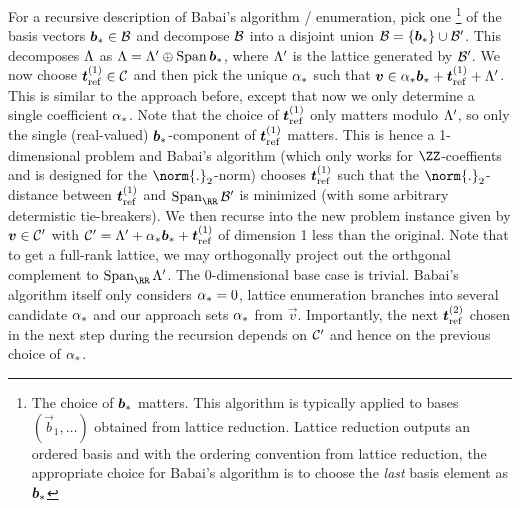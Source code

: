 \begin{remark}
For a recursive description of Babai's algorithm / enumeration, pick one%
\footnote{The choice of $\boldsymbol{b}_{\ast}$ matters. This algorithm is typically applied to bases $(\vec{b}_1,\ldots)$ obtained from lattice reduction. Lattice reduction outputs an ordered basis and with the ordering convention from lattice reduction, the appropriate choice for Babai's algorithm is to choose the \emph{last} basis element as $\boldsymbol{b}_{\ast}$}
of the basis vectors $\boldsymbol{b}_{\ast}\in\mathcal{B}$ and decompose $\mathcal{B}$ into a disjoint union
$\mathcal{B} = \{\boldsymbol{b}_{\ast}\}\cup \mathcal{B}'$. This decomposes $\Lambda$ as $\Lambda = \Lambda'\oplus \operatorname*{Span}\boldsymbol{b}_{\ast}$, where $\Lambda'$ is the lattice generated by $\mathcal{B}'$. We now choose $\boldsymbol{t}_{\mathrm{ref}}^{(1)}\in\mathcal{C}$ and then pick the unique $\alpha_{\ast}$ such that $\boldsymbol{v} \in \alpha_{\ast}\boldsymbol{b}_{\ast} + \boldsymbol{t}_{\mathrm{ref}}^{(1)} + \Lambda'$. This is similar to the approach before, except that now we only determine a single coefficient $\alpha_{\ast}$. Note that the choice of $\boldsymbol{t}_{\mathrm{ref}}^{(1)}$ only matters modulo $\Lambda'$, so only the single (real-valued) $\boldsymbol{b}_{\ast}$-component of $\boldsymbol{t}_{\mathrm{ref}}^{(1)}$ matters. This is hence a 1-dimensional problem and Babai's algorithm (which only works for $\ZZ$-coeffients and is designed for the $\norm{.}_2$-norm) chooses $\boldsymbol{t}_{\mathrm{ref}}^{(1)}$ such that the $\norm{.}_2$-distance between $\boldsymbol{t}_{\mathrm{ref}}^{(1)}$ and $\Span_{\RR}\kernelbasis'$ is minimized (with some arbitrary determistic tie-breakers).
We then recurse into the new problem instance given by $\boldsymbol{v} \in \mathcal{C}'$ with $\mathcal{C}' = \Lambda' + \alpha_{\ast}\boldsymbol{b}_{\ast} + \boldsymbol{t}_{\mathrm{ref}}^{(1)}$ of dimension 1 less than the original. Note that to get a full-rank lattice, we may orthogonally project out the orthgonal complement to $\Span_\RR\latgeneral'$. The 0-dimensional base case is trivial. Babai's algorithm itself only considers $\alpha_{\ast} = 0$, lattice enumeration branches into several candidate $\alpha_{\ast}$ and our approach sets $\alpha_{\ast}$ from $\vec{v}$. Importantly, the next $\boldsymbol{t}_{\mathrm{ref}}^{(2)}$ chosen in the next step during the recursion depends on $\mathcal{C}'$ and hence on the previous choice of $\alpha_{\ast}$.


\end{remark}
